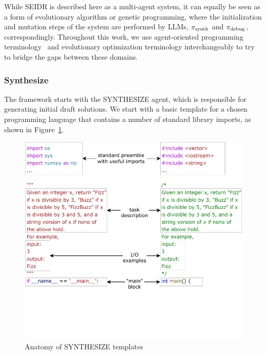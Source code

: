 While SEIDR is described here as a multi-agent system, it can equally be seen as a form of evolutionary algorithm or genetic programming, where the initialization and mutation steps of the system are performed by LLMs, $ \pi_\text{synth} $ and $ \pi_\text{debug} $, correspondingly.
Throughout this work, we use agent-oriented programming terminology~\cite{shoham1993:agentoriented} and evolutionary optimization terminology interchangeably to try to bridge the gaps between these domains.

\subsubsection{Synthesize}
\label{sec:seidr-synth}

The framework starts with the SYNTHESIZE agent, which is responsible for generating initial draft solutions.
We start with a basic template for a chosen programming language that contains a number of standard library imports, as shown in Figure~\ref{fig:template}.

\begin{figure}
    \centering
    \includegraphics[width=0.8\linewidth, trim={0mm 40mm 0mm 0mm}, clip]{images/Templates-new-v2.pdf}
    \caption{Anatomy of SYNTHESIZE templates}
    \label{fig:template}
\end{figure}

